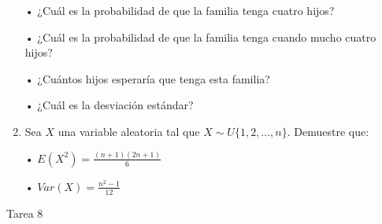 \documentclass[a4paper, 12pt]{article}
\newcommand{\Pspace}{0.5cm}
\newcommand{\Aspace}{0.2cm}
\begin{document}
\begin{enumerate}
    \vspace{\Aspace} \par
    • ¿Cuál es la probabilidad de que la familia tenga cuatro hijos?
    \\ { \color{azul}  }

    \vspace{\Aspace} \par
    • ¿Cuál es la probabilidad de que la familia tenga cuando mucho cuatro hijos?
    \\ { \color{azul}  }

    \vspace{\Aspace} \par
    • ¿Cuántos hijos esperaría que tenga esta familia?
    \\ { \color{azul}  }

    \vspace{\Aspace} \par
    • ¿Cuál es la desviación estándar?
    \\ { \color{azul}  }


    \vspace{\Pspace}
    \item Sea $X$ una variable aleatoria tal que $ X \sim U\{1, 2, \dots, n\} $. Demuestre que:
    \vspace{\Aspace} \par
    • $E(X^{2}) = \frac{(n + 1)(2n + 1)}{6}$
    \\ { \color{azul}  }

    \vspace{\Aspace} \par
    • $Var(X) = \frac{n^{2} - 1}{12}$ 
    \\ { \color{azul}  }
\end{enumerate}



\newpage
\begin{center}
    { \LARGE Tarea 8}
\end{center}
\end{document}
